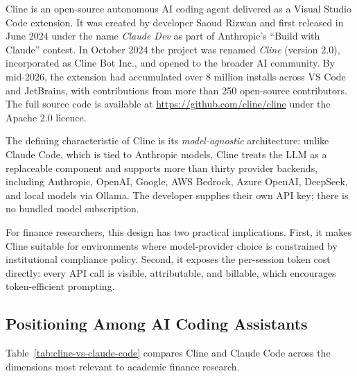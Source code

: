 \begin{context}
Cline is an open-source autonomous AI coding agent delivered as a Visual Studio
Code extension.  It was created by developer Saoud Rizwan and first released in
June 2024 under the name \emph{Claude Dev} as part of Anthropic's ``Build with
Claude'' contest.  In October 2024 the project was renamed \emph{Cline} (version
2.0), incorporated as Cline Bot Inc., and opened to the broader AI community.
By mid-2026, the extension had accumulated over 8 million installs across VS Code
and JetBrains, with contributions from more than 250 open-source contributors.
The full source code is available at \url{https://github.com/cline/cline} under
the Apache 2.0 licence.

The defining characteristic of Cline is its \emph{model-agnostic} architecture:
unlike Claude Code, which is tied to Anthropic models, Cline treats the LLM
as a replaceable component and supports more than thirty provider backends,
including Anthropic, OpenAI, Google, AWS Bedrock, Azure OpenAI, DeepSeek, and
local models via Ollama.  The developer supplies their own API key; there is no
bundled model subscription.

For finance researchers, this design has two practical implications.  First, it
makes Cline suitable for environments where model-provider choice is constrained
by institutional compliance policy.  Second, it exposes the per-session token
cost directly: every API call is visible, attributable, and billable, which
encourages token-efficient prompting.
\end{context}

\subsection{Positioning Among AI Coding Assistants}
\label{app:cline:positioning}

Table~\ref{tab:cline-vs-claude-code} compares Cline and Claude Code across
the dimensions most relevant to academic finance research.

